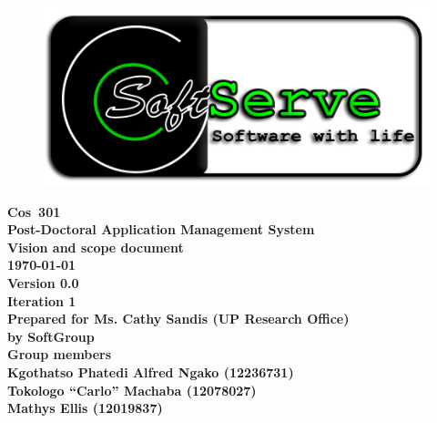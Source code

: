 \documentclass[12pt]{article}
\newcommand{\Title}{Vision and scope document} %
\newcommand{\Class}{Cos\ 301} %
\newcommand{\ssr}{Soft\color{green}{Serve }\color{black}}
\newcommand{\version}{0.0}
\newcommand{\iteration}{1}
\newcommand{\client}{Ms. Cathy Sandis (UP Research Office)}
\newcommand{\project}{Post-Doctoral Application Management System}
\begin{document}
\vspace{4em}

\begin{center}%

\begin{figure}[ht!]
\centering
\includegraphics{../Images_Docs/logo.png}
\end{figure}
\LARGE \bf \Class \\[0.25em]
\LARGE \bf \project \\[1em]
\LARGE \bf \Title \\[0.25em]
\large \bf \today\\
\bf Version \version\\
\bf Iteration \iteration\\[0.5em]
\Large \bf Prepared for \client\\
\Large \bf by
\Large {\bf \ssr Group }\\[0.5em]
\LARGE {\bf Group members}\\[0.25em]
\large
Kgothatso Phatedi Alfred Ngako (12236731) \\[0.5em]
Tokologo “Carlo” Machaba (12078027) \\[0.5em]
Mathys Ellis (12019837) \\[8em]

\end{center}%

\end{document}
